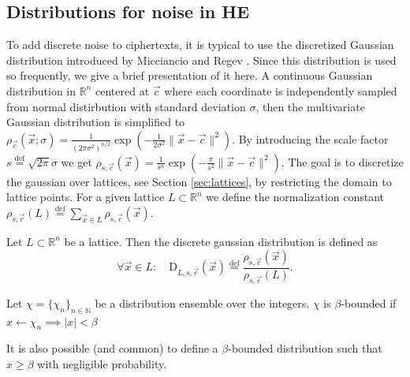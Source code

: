 \subsection*{Distributions for noise in HE}
To add discrete noise to ciphertexts, it is typical to use the discretized Gaussian distribution introduced by Micciancio and Regev \cite{disc-gauss}. Since this distribution is used so frequently, we give a brief presentation of it here. A continuous Gaussian distribution in $\mathbb{R}^n$ centered at $\vec{c}$ where each coordinate is independently sampled from normal distirbution with standard deviation $\sigma$, then the multivariate Gaussian distribution is simplified to $\rho_{\vec{c}}(\vec{x}; \sigma)=\frac{1}{\left(2 \pi \sigma^2\right)^{n / 2}} \exp \left(-\frac{1}{2 \sigma^2} \| \vec{x}-\vec{c} \| ^2\right)$. By introducing the scale factor $s \stackrel{\mathrm{def}}{=} \sqrt{2\pi}\sigma$ we get $\rho_{s, \vec{c}}(\vec{x})=\frac{1}{s^n} \exp \left(-\frac{\pi}{s^2} \| \vec{x}-\vec{c} \| ^2\right)$.
The goal is to discretize the gaussian over lattices, see Section \ref{sec:lattices}, by restricting the domain to lattice points. For a given lattice $L \subset \mathbb{R}^n$ we define the normalization constant $\rho_{s, \vec{c}}(L) \stackrel{\mathrm{def}}{=} \sum_{\vec{x} \in L} \rho_{s, \vec{c}}(\vec{x})$.
\begin{definition}\label{Disc-Gauss}
    Let $L \subset \mathbb{R}^n$ be a lattice. Then the discrete gaussian distribution is defined as
    \begin{equation*}
        \forall \vec{x} \in L \colon \quad \textrm{D}_{L, s, \vec{c}}(\vec{x}) \stackrel{\mathrm{def}}{=} \frac{\rho_{s, \vec{c}}(\vec{x})}{\rho_{s, \vec{c}}(L)}.
    \end{equation*}            
\end{definition}
\begin{definition}
    Let $\chi = \{\chi_n\}_{n\in \mathbb{N}}$ be a distribution ensemble over the integers. $\chi$ is $\beta$-bounded if $x \leftarrow \chi_n \implies |x| < \beta$
\end{definition}
\begin{remark}
    It is also possible (and common) to define a $\beta$-bounded distribution such that $x \geq \beta$ with negligible probability.
\end{remark}
